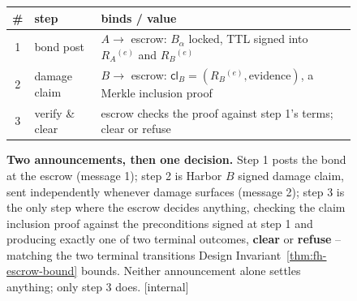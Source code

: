 \begin{figure}[H]
\vspace{4pt}
\footnotesize
\renewcommand{\arraystretch}{1.12}
\begin{tabular}{@{}c l p{6.3cm}@{}}
\toprule
\# & step & binds / value \\
\midrule
1 & bond post & $A\to$ escrow: $B_\alpha$ locked, TTL signed into $R_A{}^{(e)}$ and $R_B{}^{(e)}$ \\
2 & damage claim & $B\to$ escrow: $\mathsf{cl}_B=(R_B{}^{(e)},\mathrm{evidence})$, a Merkle inclusion proof \\
3 & verify \& clear & escrow checks the proof against step 1's terms; clear or refuse \\
\bottomrule
\end{tabular}
\normalsize
\caption{\textbf{Two announcements, then one decision.} Step 1 posts the bond
at the escrow (message 1); step 2 is Harbor $B$ signed damage claim, sent
independently whenever damage surfaces (message 2); step 3 is the only step
where the escrow decides anything, checking the claim inclusion proof against
the preconditions signed at step 1 and producing exactly one of two terminal
outcomes, \textbf{clear} or \textbf{refuse} -- matching the two terminal
transitions Design Invariant~\ref{thm:fh-escrow-bound} bounds. Neither
announcement alone settles anything; only step 3 does. [internal]}
\label{fig:fh-settle-protocol}
\end{figure}
